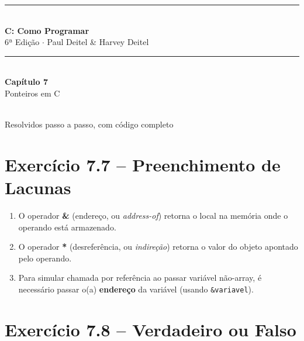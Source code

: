 \documentclass[12pt,a4paper]{article}
\begin{document}
\begin{titlepage}
  \centering\vspace*{2cm}
  {\color{deitelblue}\rule{\linewidth}{2pt}}\\[0.4cm]
  {\huge\bfseries\color{deitelblue}C: Como Programar}\\[0.2cm]
  {\large\color{deitelblue}6ª Edição $\cdot$ Paul Deitel \& Harvey Deitel}\\[0.2cm]
  {\color{deitelblue}\rule{\linewidth}{2pt}}\\[1cm]
  {\LARGE\bfseries Capítulo 7}\\[0.3cm]
  {\Large\color{deitelblue!80}Ponteiros em C}\\[0.8cm]
  \begin{tcolorbox}[colback=deitellightblue,colframe=deitelblue,width=0.85\linewidth]
    \\[0.2cm]
    {\normalsize Resolvidos passo a passo, com código completo}
  \end{tcolorbox}
\end{titlepage}

\tableofcontents\newpage

\section{Exercício 7.7 -- Preenchimento de Lacunas}

\begin{respostabox}
\begin{enumerate}[label=\textbf{\alph*)}]
\item O operador \textbf{\&} (endereço, ou \textit{address-of}) retorna o local na memória onde o operando está armazenado.
\item O operador \textbf{*} (desreferência, ou \textit{indireção}) retorna o valor do objeto apontado pelo operando.
\item Para simular chamada por referência ao passar variável não-array, é necessário passar o(a) \textbf{endereço} da variável (usando \texttt{\&variavel}).
\end{enumerate}
\end{respostabox}

\section{Exercício 7.8 -- Verdadeiro ou Falso}
\end{document}
